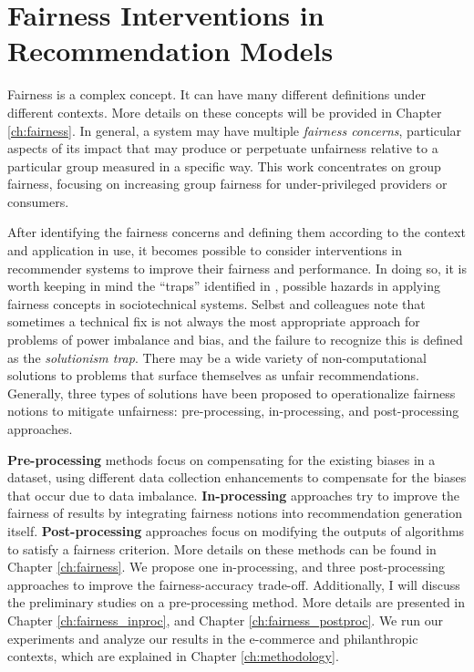 \section{Fairness Interventions in Recommendation Models}

    Fairness is a complex concept. It can have many different definitions under different contexts. More details on these concepts will be provided in Chapter \ref{ch:fairness}. In general, a system may have multiple \textit{fairness concerns}, particular aspects of its impact that may produce or perpetuate unfairness relative to a particular group measured in a specific way. This work concentrates on group fairness, focusing on increasing group fairness for under-privileged providers or consumers. %
    
    After identifying the fairness concerns and defining them according to the context and application in use, it becomes possible to consider interventions in recommender systems to improve their fairness and performance. In doing so, it is worth keeping in mind the ``traps'' identified in \cite{selbst2019fairness}, possible hazards in applying fairness concepts in sociotechnical systems. Selbst and colleagues note that sometimes a technical fix is not always the most appropriate approach for problems of power imbalance and bias, and the failure to recognize this is defined as the \textit{solutionism trap}. There may be a wide variety of non-computational solutions to problems that surface themselves as unfair recommendations. Generally, three types of solutions have been proposed to operationalize fairness notions to mitigate unfairness: pre-processing, in-processing, and post-processing approaches.
    
    \textbf{Pre-processing} methods focus on compensating for the existing biases in a dataset, using different data collection enhancements to compensate for the biases that occur due to data imbalance. \textbf{In-processing} approaches try to improve the fairness of results by integrating fairness notions into recommendation generation itself. \textbf{Post-processing} approaches focus on modifying the outputs of algorithms to satisfy a fairness criterion. More details on these methods can be found in Chapter \ref{ch:fairness}. We propose one in-processing, and three post-processing approaches to improve the fairness-accuracy trade-off. Additionally, I will discuss the preliminary studies on a pre-processing method. More details are presented in Chapter \ref{ch:fairness_inproc}, and Chapter \ref{ch:fairness_postproc}. We run our experiments and analyze our results in the e-commerce and philanthropic contexts, which are explained in Chapter \ref{ch:methodology}.

